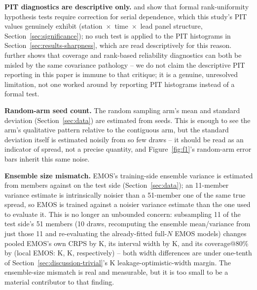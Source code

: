 \textbf{PIT diagnostics are descriptive only.}
\citet{broecker_2018_serial_dependence} and
\citet{broecker_2020_stratified_rank} show that formal rank-uniformity
hypothesis tests require correction for serial dependence, which this
study's PIT values genuinely exhibit (station~$\times$~time~$\times$~lead
panel structure, Section~\ref{sec:significance}); no such test is applied
to the PIT histograms in Section~\ref{sec:results-sharpness}, which are
read descriptively for this reason.
\citet{dirkson_2025_misdiagnosing_reliability} further shows that coverage
and rank-based reliability diagnostics can both be misled by the same
covariance pathology -- we do not claim the descriptive PIT reporting in
this paper is immune to that critique; it is a genuine, unresolved
limitation, not one worked around by reporting PIT histograms instead of
a formal test.

\textbf{Random-arm seed count.} The random sampling arm's mean and
standard deviation (Section~\ref{sec:data}) are estimated from
\DataSizeSweepSeeds{} seeds. This is enough to see the arm's qualitative
pattern relative to the contiguous arm, but the standard deviation itself
is estimated noisily from so few draws -- it should be read as an
indicator of spread, not a precise quantity, and Figure~\ref{fig:f1}'s
random-arm error bars inherit this same noise.

\textbf{Ensemble size mismatch.} EMOS's training-side ensemble variance is
estimated from \TrainEnsembleMembers{} members against
\TestEnsembleMembers{} on the test side (Section~\ref{sec:data}); an
11-member variance estimate is intrinsically noisier than a 51-member one
of the same true spread, so EMOS is trained against a noisier variance
estimate than the one used to evaluate it. This is no longer an
unbounded concern: subsampling 11 of the test side's 51 members (10
draws, recomputing the ensemble mean/variance from just those 11 and
re-evaluating the already-fitted full-\(N\) EMOS models) changes pooled
EMOS's own CRPS by \EnsSubsampleCrpsDiffPooled{} K, its interval width by
\EnsSubsampleWidthDiffPooled{} K, and its coverage@80\% by
\EnsSubsampleCoverageDiffPooled{} (local EMOS: \EnsSubsampleCrpsDiffLocal{} K,
\EnsSubsampleWidthDiffLocal{} K, \EnsSubsampleCoverageDiffLocal{}
respectively) -- both width differences are under one-tenth of
Section~\ref{sec:discussion-trivial}'s \InflLeakyWidthDiffPoint{} K
leakage-optimistic-width margin. The ensemble-size mismatch is real and
measurable, but it is too small to be a material contributor to that
finding.

